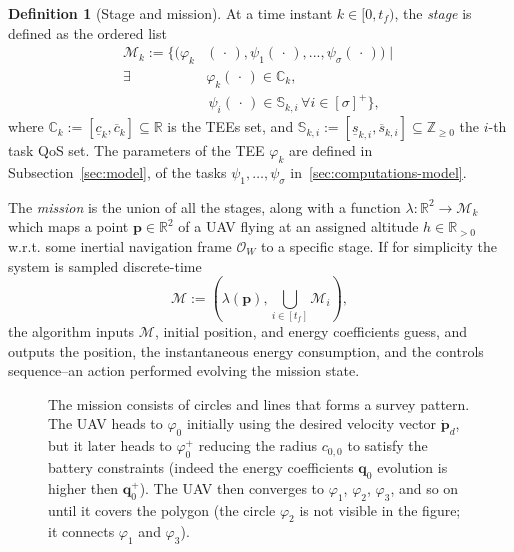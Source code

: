 \documentclass[letterpaper,10pt,conference]{ieeeconf}
\newcommand{\figpath}{./figures}
\theoremstyle{definition}
\newtheorem{defn}{Definition}[section]
\begin{document}
\begin{defn}[Stage and mission]\label{def:mission}
  At a time instant $k\in[0,t_f)$, the \emph{stage} is defined as the ordered list
  \begin{equation}\label{eq:mission}\begin{split}
    \mathcal{M}_k:=\{(\varphi_k&(\,\cdot\,),\psi_1(\,\cdot\,),...,\psi_\sigma(\,\cdot\,))\mid\\\exists\,\,&\varphi_k(\,\cdot\,)\in\mathbb{C}_k,\,\\&\,\psi_i(\,\cdot\,)\in\mathbb{S}_{k,i}\,\forall i\in[\sigma]^+\},
  \end{split}\end{equation}
  where $\mathbb{C}_k:=[\underline{c}_k,\overline{c}_k]\subseteq\mathbb{R}$ is the TEEs set, and $\mathbb{S}_{k,i}:=[\underline{s}_{k,i},\overline{s}_{k,i}]\subseteq\mathbb{Z}_{\geq 0}$ the $i$-th task QoS set. The parameters of the TEE $\varphi_k$ are defined in Subsection~\ref{sec:model}, of the tasks $\psi_1,\dots,\psi_\sigma$ in~\ref{sec:computations-model}.

  The \emph{mission} is the union of all the stages, along with a function $\lambda:\mathbb{R}^2\rightarrow\mathcal{M}_k$ which maps a point $\mathbf{p}\in\mathbb{R}^2$ of a UAV flying at an assigned altitude $h\in\mathbb{R}_{>0}$ w.r.t. some inertial navigation frame $\mathcal{O}_W$ to a specific stage. If for simplicity the system is sampled discrete-time
  \begin{equation}
    \mathcal{M}:=(\lambda(\mathbf{p}),\bigcup_{i\in[t_f]}{\mathcal{M}_i}),
  \end{equation}
  the algorithm inputs $\mathcal{M}$, initial position, and energy coefficients guess, and outputs the position, the instantaneous energy consumption, and the controls sequence--an action performed evolving the mission state.
\end{defn}

\begin{figure}[t]
  \centering
  
  \caption{The mission consists of circles and lines that forms a survey pattern. The UAV heads to $\varphi_0$ initially using the desired velocity vector $\dot{\mathbf{p}}_d$, but it later heads to $\varphi_0^+$ reducing the radius $c_{0,0}$ to satisfy the battery constraints (indeed the energy coefficients $\mathbf{q}_0$ evolution is higher then $\mathbf{q}_0^+$). The UAV then converges to $\varphi_1$, $\varphi_2$, $\varphi_3$, and so on until it covers the polygon (the circle $\varphi_2$ is not visible in the figure; it connects $\varphi_1$ and $\varphi_3$).}
  \label{fig:overview}
\end{figure}
\end{document}
